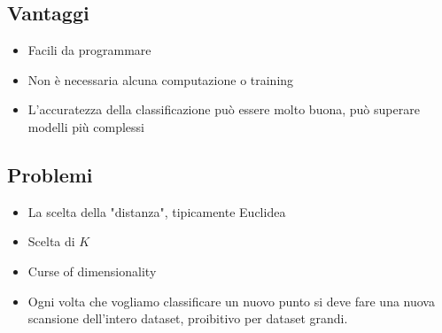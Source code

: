 \subsection{Vantaggi}
\begin{itemize}
	\item Facili da programmare
	\item Non \`e necessaria alcuna computazione o training
	\item L'accuratezza della classificazione può essere molto buona, può superare modelli più complessi
\end{itemize}
\subsection{Problemi}
\begin{itemize}
	\item La scelta della "distanza", tipicamente Euclidea
	\item Scelta di $K$
	\item Curse of dimensionality
	\item Ogni volta che vogliamo classificare un nuovo punto si deve fare una nuova scansione dell'intero dataset, proibitivo per dataset grandi.
\end{itemize}